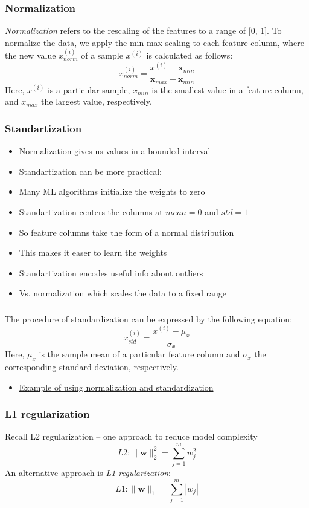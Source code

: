 \documentclass{beamer}
\begin{document}
\begin{frame}
  \frametitle{Normalization}
  \textit{Normalization} refers to the rescaling of the features to a range of [0, 1].  To normalize the data, we apply the min-max scaling to each feature column, where the new value $x_{norm}^{(i)}$ of a sample  $x^{(i)}$ is calculated as follows:
  \[
  x_{norm}^{(i)} = \frac{x^{(i)} - \mathbf{x}_{min}}{\mathbf{x}_{max} - \mathbf{x}_{min}}
  \]
  Here, $x^{(i)}$ is a particular sample, $x_{min}$ is the smallest value in a feature column, and $x_{max}$ the largest value, respectively.
\end{frame}

\begin{frame}
  \frametitle{Standartization}
  \begin{itemize}
  \item Normalization gives us values in a bounded interval
  \item Standartization can be more practical:
  \item Many ML algorithms initialize the weights to zero
  \item Standartization centers the columns at $mean=0$ and $std=1$
  \item So feature columns take the form of a normal distribution
  \item This makes it easer to learn the weights
  \item Standartization encodes useful info about outliers
  \item Vs. normalization which scales the data to a fixed range
  \end{itemize}
\end{frame}

\begin{frame}
  \frametitle{}
  The procedure of standardization can be expressed by the following equation:
  \[
  x_{std}^{(i)} = \frac{x^{(i)} - \mu_{x}}{\sigma_{x}}
  \]
  Here, $\mu_{x}$ is the sample mean of a particular feature column and $\sigma_{x}$ the corresponding standard deviation, respectively.
  \begin{itemize}
  \item \href{https://github.com/rasbt/python-machine-learning-book/blob/master/code/ch04/ch04.ipynb}{Example of using normalization and standardization}
  \end{itemize}
\end{frame}

\begin{frame}
  \frametitle{L1 regularization}
  Recall L2 regularization -- one approach to reduce model complexity
  \[
  L2: \lVert \mathbf{w} \rVert^{2}_{2} = \sum_{j=1}^{m} w^{2}_{j}
  \]
  An alternative approach is \textit{L1 regularization}:
  \[
  L1: \lVert \mathbf{w} \rVert_{1} = \sum_{j=1}^{m} |w_j|
  \]
\end{frame}
\end{document}
